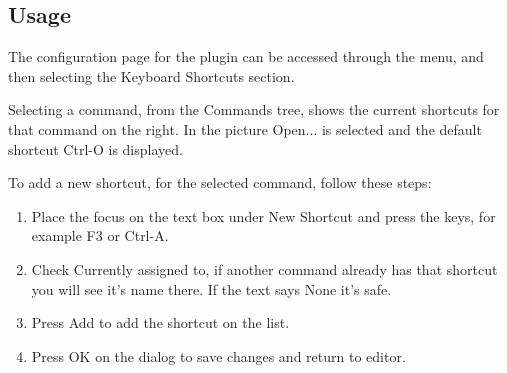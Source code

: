 \subsection{Usage}

The configuration page for the plugin can be accessed through the  menu, and then selecting the Keyboard Shortcuts section.


Selecting a command, from the Commands tree, shows the current shortcuts for that command on the right. In the picture Open... is selected and the default shortcut Ctrl-O is displayed.

To add a new shortcut, for the selected command, follow these steps:

\begin{enumerate}
\item Place the focus on the text box under New Shortcut and press the keys, for example F3 or Ctrl-A.
\item Check Currently assigned to, if another command already has that shortcut you will see it's name there. If the text says None it's safe.
\item Press Add to add the shortcut on the list.
\item Press OK on the dialog to save changes and return to editor.
\end{enumerate}
    



